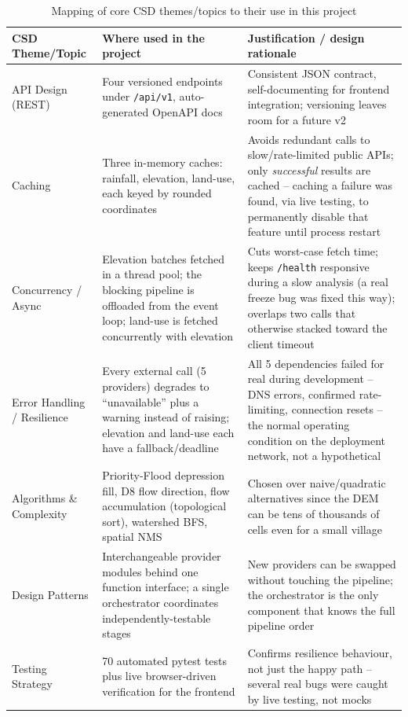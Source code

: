 \documentclass[manuscript,screen]{acmart}
\begin{document}
\begin{table}[t]
  \small
  \renewcommand{\arraystretch}{0.85}
  \caption{Mapping of core CSD themes/topics to their use in this project}
  \label{tab:csd-themes}
  \begin{tabular}{p{2.5cm}p{5.4cm}p{6.4cm}}
    \toprule
    CSD Theme/Topic & Where used in the project & Justification / design rationale \\
    \midrule
    API Design (REST) & Four versioned endpoints under \texttt{/api/v1}, auto-generated OpenAPI docs & Consistent JSON contract, self-documenting for frontend integration; versioning leaves room for a future v2 \\
    Caching & Three in-memory caches: rainfall, elevation, land-use, each keyed by rounded coordinates & Avoids redundant calls to slow/rate-limited public APIs; only \emph{successful} results are cached -- caching a failure was found, via live testing, to permanently disable that feature until process restart \\
    Concurrency / Async & Elevation batches fetched in a thread pool; the blocking pipeline is offloaded from the event loop; land-use is fetched concurrently with elevation & Cuts worst-case fetch time; keeps \texttt{/health} responsive during a slow analysis (a real freeze bug was fixed this way); overlaps two calls that otherwise stacked toward the client timeout \\
    Error Handling / Resilience & Every external call (5 providers) degrades to ``unavailable'' plus a warning instead of raising; elevation and land-use each have a fallback/deadline & All 5 dependencies failed for real during development -- DNS errors, confirmed rate-limiting, connection resets -- the normal operating condition on the deployment network, not a hypothetical \\
    Algorithms \& Complexity & Priority-Flood depression fill, D8 flow direction, flow accumulation (topological sort), watershed BFS, spatial NMS & Chosen over naive/quadratic alternatives since the DEM can be tens of thousands of cells even for a small village \\
    Design Patterns & Interchangeable provider modules behind one function interface; a single orchestrator coordinates independently-testable stages & New providers can be swapped without touching the pipeline; the orchestrator is the only component that knows the full pipeline order \\
    Testing Strategy & 70 automated pytest tests plus live browser-driven verification for the frontend & Confirms resilience behaviour, not just the happy path -- several real bugs were caught by live testing, not mocks \\

\end{tabular}
\end{table}
\end{document}
